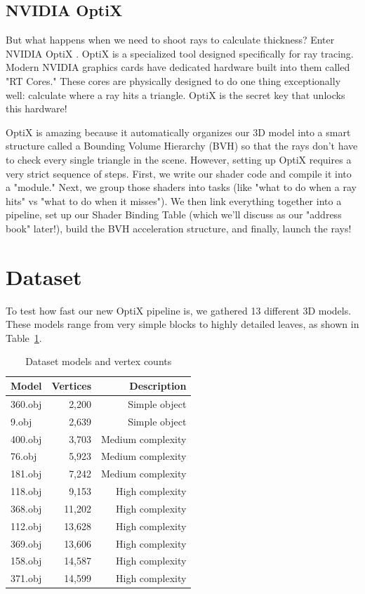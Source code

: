 \subsection{NVIDIA OptiX}

But what happens when we need to shoot rays to calculate thickness? Enter NVIDIA OptiX \cite{optix}. OptiX is a specialized tool designed specifically for ray tracing. Modern NVIDIA graphics cards have dedicated hardware built into them called "RT Cores." These cores are physically designed to do one thing exceptionally well: calculate where a ray hits a triangle. OptiX is the secret key that unlocks this hardware!

OptiX is amazing because it automatically organizes our 3D model into a smart structure called a Bounding Volume Hierarchy (BVH) so that the rays don't have to check every single triangle in the scene. However, setting up OptiX requires a very strict sequence of steps. First, we write our shader code and compile it into a "module." Next, we group those shaders into tasks (like "what to do when a ray hits" vs "what to do when it misses"). We then link everything together into a pipeline, set up our Shader Binding Table (which we'll discuss as our "address book" later!), build the BVH acceleration structure, and finally, launch the rays!

\section{Dataset}

To test how fast our new OptiX pipeline is, we gathered 13 different 3D models. These models range from very simple blocks to highly detailed leaves, as shown in Table~\ref{tab:dataset}.

\begin{table}[h]
\centering
\begin{tabular}{@{}lrr@{}}
\toprule
\textbf{Model} & \textbf{Vertices} & \textbf{Description} \\
\midrule
360.obj & 2,200 & Simple object \\
9.obj & 2,639 & Simple object \\
400.obj & 3,703 & Medium complexity \\
76.obj & 5,923 & Medium complexity \\
181.obj & 7,242 & Medium complexity \\
118.obj & 9,153 & High complexity \\
368.obj & 11,202 & High complexity \\
112.obj & 13,628 & High complexity \\
369.obj & 13,606 & High complexity \\
158.obj & 14,587 & High complexity \\
371.obj & 14,599 & High complexity \\
\bottomrule
\end{tabular}
\caption{Dataset models and vertex counts}
\label{tab:dataset}
\end{table}

